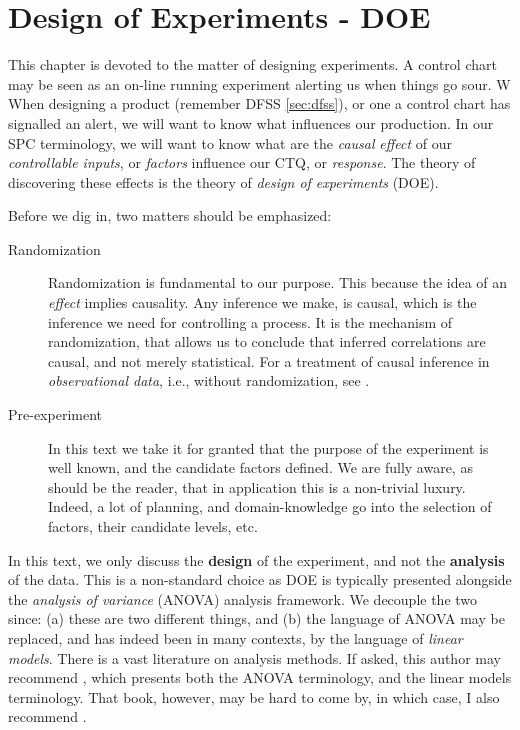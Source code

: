 \chapter[DOE]{Design of Experiments - DOE}

This chapter is devoted to the matter of designing experiments.
A control chart may be seen as an on-line running experiment alerting us when things go sour. W
When designing a product (remember DFSS \ref{sec:dfss}), or one a control chart has signalled an alert, we will want to know what influences our production.
In our SPC terminology, we will want to know what are the \emph{causal} \emph{effect} of our \emph{controllable inputs}, or \emph{factors} influence our CTQ, or \emph{response}. 
The theory of discovering these effects is the theory of \emph{design of experiments} (DOE).



Before we dig in, two matters should be emphasized:
\begin{description}
\item [Randomization] Randomization is fundamental to our purpose. This because the idea of an \emph{effect} implies causality. Any inference we make, is causal, which is the inference we need for controlling a process.
It is the mechanism of randomization, that allows us to conclude that inferred correlations are causal, and not merely statistical.
For a treatment of causal inference in \emph{observational data}, i.e., without randomization, see \cite{rosenbaum_observational_2002}.

\item [Pre-experiment] In this text we take it for granted that the purpose of the experiment is well known, and the candidate factors defined. We are fully aware, as should be the reader, that in application this is a non-trivial luxury. Indeed, a lot of planning, and domain-knowledge go into the selection of factors, their candidate levels, etc.

\end{description}



\begin{remark}
In this text, we only discuss the \textbf{design} of the experiment, and not the \textbf{analysis} of the data.
This is a non-standard choice as DOE is typically presented alongside the \emph{analysis of variance} (ANOVA) analysis framework.
We decouple the two since: 
(a) these are two different things, and 
(b) the language of ANOVA may be replaced, and has indeed been in many contexts, by the language of \emph{linear models}.
There is a vast literature on analysis methods. 
If asked, this author may recommend \cite{hocking_analysis_1985}, which presents both the ANOVA terminology, and the linear models terminology.
That book, however, may be hard to come by, in which case, I also recommend \cite{mason_statistical_2003}.
\end{remark}





